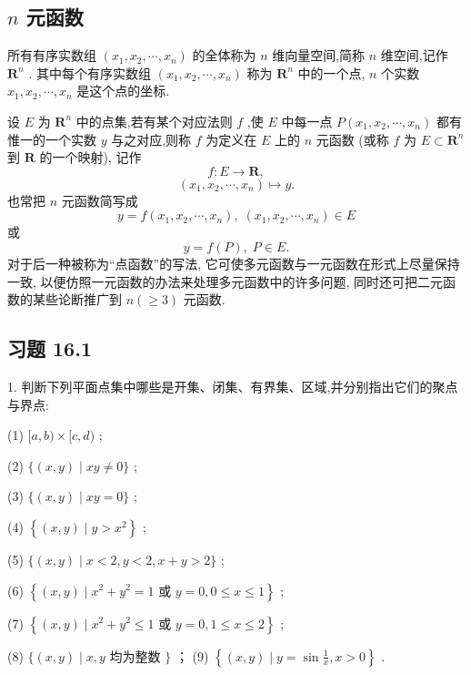 \subsection{ \(n\) 元函数}

所有有序实数组 \(\left( {{x}_{1},{x}_{2},\cdots ,{x}_{n}}\right)\) 的全体称为 \(n\) 维向量空间,简称 \(n\) 维空间,记作 \({\mathbf{R}}^{n}\) . 其中每个有序实数组 \(\left( {{x}_{1},{x}_{2},\cdots ,{x}_{n}}\right)\) 称为 \({\mathbf{R}}^{n}\) 中的一个点, \(n\) 个实数 \({x}_{1},{x}_{2},\cdots ,{x}_{n}\) 是这个点的坐标.

设 \(E\) 为 \({\mathbf{R}}^{n}\) 中的点集,若有某个对应法则 \(f\) ,使 \(E\) 中每一点 \(P\left( {{x}_{1},{x}_{2},\cdots ,{x}_{n}}\right)\) 都有惟一的一个实数 \(y\) 与之对应,则称 \(f\) 为定义在 \(E\) 上的 \(n\) 元函数 (或称 \(f\) 为 \(E \subset  {\mathbf{R}}^{n}\) 到 \(\mathbf{R}\) 的一个映射), 记作
\[
f : E \rightarrow  \mathbf{R},
\]
\[
\left( {{x}_{1},{x}_{2},\cdots ,{x}_{n}}\right)  \mapsto  y. \tag{8}
\]
也常把 \(n\) 元函数简写成
\[
y = f\left( {{x}_{1},{x}_{2},\cdots ,{x}_{n}}\right) ,\;\left( {{x}_{1},{x}_{2},\cdots ,{x}_{n}}\right)  \in  E
\]
或
\[
y = f\left( P\right) ,\;P \in  E. \tag{9}
\]
对于后一种被称为“点函数”的写法, 它可使多元函数与一元函数在形式上尽量保持一致, 以便仿照一元函数的办法来处理多元函数中的许多问题, 同时还可把二元函数的某些论断推广到 \(n\left( { \geq  3}\right)\) 元函数.

\subsection{习题 16.1}

1. 判断下列平面点集中哪些是开集、闭集、有界集、区域,并分别指出它们的聚点与界点:

(1) \(\lbrack a,b) \times  \lbrack c,d)\) ;

(2) \(\{ \left( {x,y}\right)  \mid  {xy} \neq  0\}\) ;

(3) \(\{ \left( {x,y}\right)  \mid  {xy} = 0\}\) ;

(4) \(\left\{  {\left( {x,y}\right)  \mid  y > {x}^{2}}\right\}\) ;

(5) \(\{ \left( {x,y}\right)  \mid  x < 2,y < 2,x + y > 2\}\) ;

(6) \(\left\{  {\left( {x,y}\right)  \mid  {x}^{2} + {y}^{2} = 1\text{ 或 }y = 0,0 \leq  x \leq  1}\right\}\) ;

(7) \(\left\{  {\left( {x,y}\right)  \mid  {x}^{2} + {y}^{2} \leq  1\text{ 或 }y = 0,1 \leq  x \leq  2}\right\}\) ;

(8) \(\{ \left( {x,y}\right)  \mid  x,y\) 均为整数 \(\}\) ； (9) \(\left\{  {\left( {x,y}\right)  \mid  y = \sin \frac{1}{x},x > 0}\right\}\) .

